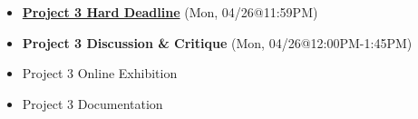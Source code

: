 \def\dMon{Mon, 04/26}
\def\dTues{Tues, 04/27}
\def\dWed{Wed, 04/28}
\def\dThur{Thur, 04/29}
\def\dFri{Fri, 04/30}
\def\dSat{Sat, 05/01}
\def\dSun{Sun, 05/02}
\placeDate

\begin{itemize}[noitemsep,topsep=0pt,leftmargin=*]
    \item \textcolor{defaultColor}{\ul{\textbf{Project 3 Hard Deadline}} (\dMon @11:59PM)}
    \item \textcolor{defaultColor}{\textbf{Project 3 Discussion \& Critique} (\dMon @12:00PM-1:45PM)}
    \item Project 3 Online Exhibition
    \item Project 3 Documentation
\end{itemize}